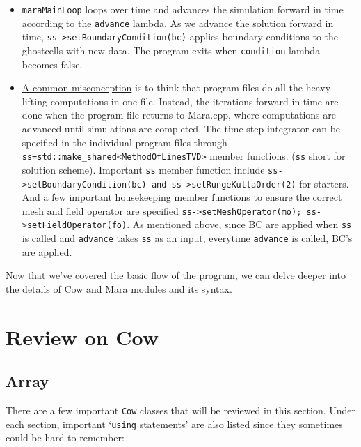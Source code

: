 \documentclass{article}
\begin{document}
\begin{itemize}
	\item \texttt{maraMainLoop} loops over time and advances the simulation forward in time according to the \texttt{advance} lambda. As we advance the solution forward in time, \texttt{ss->setBoundaryCondition(bc)} applies boundary conditions to the ghostcells with new data. The program exits when \texttt{condition} lambda becomes false.
	
	\item \underline{A common misconception} is to think that program files do all the heavy-lifting computations in one file. Instead, the iterations forward in time are done when the program file returns to Mara.cpp, where computations are advanced until simulations are completed. The time-step integrator can be specified in the individual program files through \texttt{ss=std::make\_shared<MethodOfLinesTVD>} member functions. (\texttt{ss} short for solution scheme). Important \texttt{ss} member function include \texttt{ss->setBoundaryCondition(bc) and ss->setRungeKuttaOrder(2)} for starters. And a few important housekeeping member functions to ensure the correct mesh and field operator are specified \texttt{ss->setMeshOperator(mo); ss->setFieldOperator(fo)}. As mentioned above, since BC are applied when \texttt{ss} is called and \texttt{advance} takes \texttt{ss} as an input, everytime \texttt{advance} is called, BC's are applied. 
\end{itemize}

Now that we've covered the basic flow of the program, we can delve deeper into the details of Cow and Mara modules and its syntax.

\section{Review on Cow}
\subsection{Array}

There are a few important \texttt{Cow} classes that will be reviewed in this section. Under each section, important `\texttt{using} statements' are also listed since they sometimes could be hard to remember:
\end{document}
